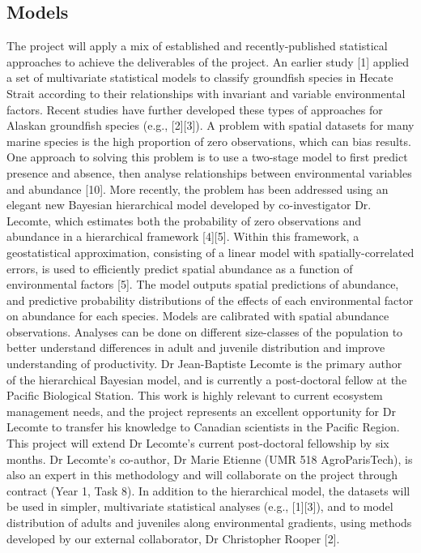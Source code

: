 \documentclass[11pt]{book}\usepackage[]{graphicx}\usepackage[]{color}
\begin{document}
\subsection{Models}
The project will apply a mix of established and recently-published statistical approaches to achieve the deliverables of the project. An earlier study [1] applied a set of multivariate statistical models to classify groundfish species in Hecate Strait according to their relationships with invariant and variable environmental factors. Recent studies have further developed these types of approaches for Alaskan groundfish species (e.g., [2][3]). A problem with spatial datasets for many marine species is the high proportion of zero observations, which can bias results. One approach to solving this problem is to use a two-stage model to first predict presence and absence, then analyse relationships between environmental variables and abundance [10]. More recently, the problem has been addressed using an elegant new Bayesian hierarchical model developed by co-investigator Dr. Lecomte,  which estimates both the probability of zero observations and abundance in a hierarchical framework [4][5]. Within this framework, a geostatistical approximation, consisting of a linear model with spatially-correlated errors, is used to efficiently predict spatial abundance as a function of environmental factors [5]. The model outputs spatial predictions of abundance, and predictive probability distributions of the effects of each environmental factor on abundance for each species. 
Models are calibrated with spatial abundance observations. Analyses can be done on different size-classes of the population to better understand differences in adult and juvenile distribution and improve understanding of productivity. Dr Jean-Baptiste Lecomte is the primary author of the hierarchical Bayesian model, and is currently a post-doctoral fellow at the Pacific Biological Station. This work is highly relevant to current ecosystem management needs, and the project represents an excellent opportunity for Dr Lecomte to transfer his knowledge to Canadian scientists in the Pacific Region. This project will extend Dr Lecomte's current post-doctoral fellowship by six months. Dr Lecomte's co-author, Dr Marie Etienne (UMR 518 AgroParisTech), is also an expert in this methodology and will collaborate on the project through contract (Year 1, Task 8). In addition to the hierarchical model, the datasets will be used in simpler, multivariate statistical analyses (e.g., [1][3]), and to model distribution of adults and juveniles along environmental gradients, using methods developed by our external collaborator, Dr Christopher Rooper [2].
\end{document}
